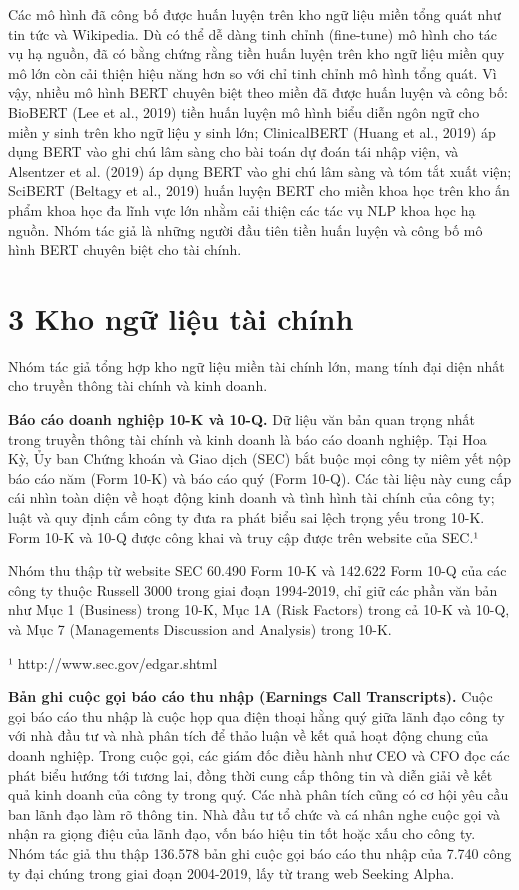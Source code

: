 Các mô hình đã công bố được huấn luyện trên kho ngữ liệu miền tổng quát như tin tức và Wikipedia. Dù có thể dễ dàng tinh chỉnh (fine-tune) mô hình cho tác vụ hạ nguồn, đã có bằng chứng rằng tiền huấn luyện trên kho ngữ liệu miền quy mô lớn còn cải thiện hiệu năng hơn so với chỉ tinh chỉnh mô hình tổng quát. Vì vậy, nhiều mô hình BERT chuyên biệt theo miền đã được huấn luyện và công bố: BioBERT (Lee et al., 2019) tiền huấn luyện mô hình biểu diễn ngôn ngữ cho miền y sinh trên kho ngữ liệu y sinh lớn; ClinicalBERT (Huang et al., 2019) áp dụng BERT vào ghi chú lâm sàng cho bài toán dự đoán tái nhập viện, và Alsentzer et al. (2019) áp dụng BERT vào ghi chú lâm sàng và tóm tắt xuất viện; SciBERT (Beltagy et al., 2019) huấn luyện BERT cho miền khoa học trên kho ấn phẩm khoa học đa lĩnh vực lớn nhằm cải thiện các tác vụ NLP khoa học hạ nguồn. Nhóm tác giả là những người đầu tiên tiền huấn luyện và công bố mô hình BERT chuyên biệt cho tài chính.

\section{3 Kho ngữ liệu tài chính}

Nhóm tác giả tổng hợp kho ngữ liệu miền tài chính lớn, mang tính đại diện nhất cho truyền thông tài chính và kinh doanh.

\textbf{Báo cáo doanh nghiệp 10-K và 10-Q.} Dữ liệu văn bản quan trọng nhất trong truyền thông tài chính và kinh doanh là báo cáo doanh nghiệp. Tại Hoa Kỳ, Ủy ban Chứng khoán và Giao dịch (SEC) bắt buộc mọi công ty niêm yết nộp báo cáo năm (Form 10-K) và báo cáo quý (Form 10-Q). Các tài liệu này cung cấp cái nhìn toàn diện về hoạt động kinh doanh và tình hình tài chính của công ty; luật và quy định cấm công ty đưa ra phát biểu sai lệch trọng yếu trong 10-K. Form 10-K và 10-Q được công khai và truy cập được trên website của SEC.¹

Nhóm thu thập từ website SEC 60.490 Form 10-K và 142.622 Form 10-Q của các công ty thuộc Russell 3000 trong giai đoạn 1994-2019, chỉ giữ các phần văn bản như Mục 1 (Business) trong 10-K, Mục 1A (Risk Factors) trong cả 10-K và 10-Q, và Mục 7 (Management\textquotesingle s Discussion and Analysis) trong 10-K.

¹ http://www.sec.gov/edgar.shtml

\textbf{Bản ghi cuộc gọi báo cáo thu nhập (Earnings Call Transcripts).} Cuộc gọi báo cáo thu nhập là cuộc họp qua điện thoại hằng quý giữa lãnh đạo công ty với nhà đầu tư và nhà phân tích để thảo luận về kết quả hoạt động chung của doanh nghiệp. Trong cuộc gọi, các giám đốc điều hành như CEO và CFO đọc các phát biểu hướng tới tương lai, đồng thời cung cấp thông tin và diễn giải về kết quả kinh doanh của công ty trong quý. Các nhà phân tích cũng có cơ hội yêu cầu ban lãnh đạo làm rõ thông tin. Nhà đầu tư tổ chức và cá nhân nghe cuộc gọi và nhận ra giọng điệu của lãnh đạo, vốn báo hiệu tin tốt hoặc xấu cho công ty. Nhóm tác giả thu thập 136.578 bản ghi cuộc gọi báo cáo thu nhập của 7.740 công ty đại chúng trong giai đoạn 2004-2019, lấy từ trang web Seeking Alpha.


